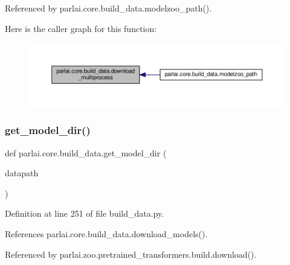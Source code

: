 Referenced by parlai.\+core.\+build\+\_\+data.\+modelzoo\+\_\+path().

Here is the caller graph for this function\+:
\nopagebreak
\begin{figure}[H]
\begin{center}
\leavevmode
\includegraphics[width=350pt]{namespaceparlai_1_1core_1_1build__data_ae259aeb321a77560fbcd23028178c897_icgraph}
\end{center}
\end{figure}
\mbox{\label{namespaceparlai_1_1core_1_1build__data_ad2fe6222094caae59f304931aee0952a}} 
\subsubsection{\texorpdfstring{get\+\_\+model\+\_\+dir()}{get\_model\_dir()}}
{\footnotesize\ttfamily def parlai.\+core.\+build\+\_\+data.\+get\+\_\+model\+\_\+dir (\begin{DoxyParamCaption}\item[{}]{datapath }\end{DoxyParamCaption})}



Definition at line 251 of file build\+\_\+data.\+py.



References parlai.\+core.\+build\+\_\+data.\+download\+\_\+models().



Referenced by parlai.\+zoo.\+pretrained\+\_\+transformers.\+build.\+download().

